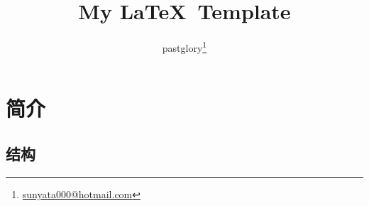 \documentclass[zh]{pgreport}
\title {My \LaTeX\ Template}
\author{pastglory\thanks{\href{mailto:sunyata000@hotmail.com}{sunyata000@hotmail.com}}}
\date{}
\begin{document}
\maketitle

\tableofcontents

\begin{abstract}

\end{abstract}

\section{简介}


\subsection{结构}


\appendix


\end{document}
